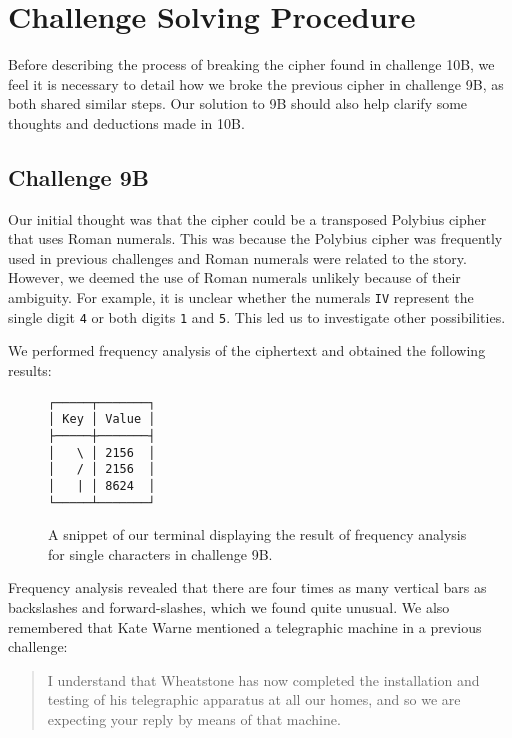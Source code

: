 \section*{Challenge Solving Procedure}

Before describing the process of breaking the cipher found in challenge 10B, we feel it is necessary to detail how we broke the previous cipher in challenge 9B, as both shared similar steps. Our solution to 9B should also help clarify some thoughts and deductions made in 10B.

\subsection*{Challenge 9B}

Our initial thought was that the cipher could be a transposed Polybius cipher that uses Roman numerals. This was because the Polybius cipher was frequently used in previous challenges and Roman numerals were related to the story. However, we deemed the use of Roman numerals unlikely because of their ambiguity. For example, it is unclear whether the numerals \texttt{IV} represent the single digit \texttt{4} or both digits \texttt{1} and \texttt{5}. This led us to investigate other possibilities.

We performed frequency analysis of the ciphertext and obtained the following results:

\begin{figure}[H]
\centering
\begin{minipage}{15ex}
\begin{verbatim}        
┌─────┬───────┐
│ Key │ Value │
├─────┼───────┤
│   \ │ 2156  │
│   / │ 2156  │
│   | │ 8624  │
└─────┴───────┘      
\end{verbatim}
\end{minipage}
\label{fig:char_count_9b}
\caption{A snippet of our terminal displaying the result of frequency analysis for single characters in challenge 9B.}
\end{figure}

Frequency analysis revealed that there are four times as many vertical bars as backslashes and forward-slashes, which we found quite unusual. We also remembered that Kate Warne mentioned a telegraphic machine in a previous challenge:

\begin{quote}\ttfamily
I understand that Wheatstone has now completed the installation and testing of his telegraphic apparatus at all our homes, and so we are expecting your reply by means of that machine.    
\end{quote}

